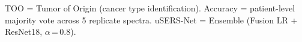 \documentclass[11pt,landscape]{article}
\begin{document}
\vspace{10pt}

\begin{center}
\small\color{textmed}
TOO = Tumor of Origin (cancer type identification).
Accuracy = patient-level majority vote across 5 replicate spectra.
uSERS-Net = Ensemble (Fusion LR + ResNet18, $\alpha$\,=\,0.8).
\end{center}
\end{document}
